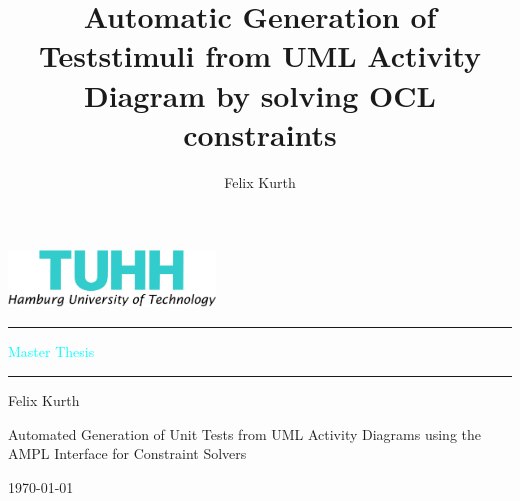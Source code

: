 \documentclass[twoside, english,numbers=noenddot, abstracton, headsepline, openright]{scrreprt}
\author{Felix Kurth}
\title{Automatic Generation of Teststimuli from UML Activity Diagram by solving OCL constraints}
\begin{document}
\titlepage

\setlength{\parskip}{1pt}

\noindent \begin{flushright}
\includegraphics[width=55mm,height=16mm]{pics/tuhh_logo}
\par\end{flushright}

\textcolor{cyan}{\rule[0.5ex]{1\columnwidth}{0.5pt}}

\textsf{\textcolor{cyan}{\Large Master Thesis}}{\Large \par}

\textcolor{cyan}{\rule[0.5ex]{1\columnwidth}{0.5pt}}

\vspace{32mm}


\noindent \begin{flushright}
\textsf{\Large  Felix Kurth}\textsf{\textbf{\Large }}\\
\textsf{\vspace{1.2cm}
}
\par\end{flushright}

\noindent \begin{flushright}
\textsf{\huge Automated Generation of Unit Tests from UML Activity Diagrams using the AMPL Interface for Constraint Solvers}\\
\par\end{flushright}{\huge \par}

\vspace{45mm}


\noindent \begin{flushright}
\textsf{\Large \today}
\par\end{flushright}{\Large \par}
\end{document}
